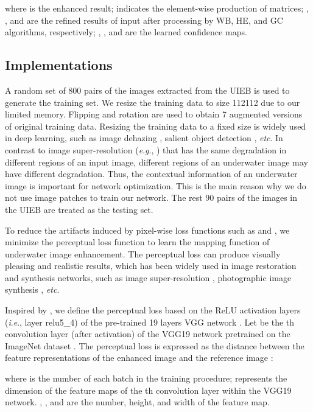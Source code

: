 \documentclass[journal]{IEEEtran}
\newcommand{\ie}{\textit{i}.\textit{e}.}
\newcommand{\eg}{\textit{e}.\textit{g}.}
\newcommand{\etc}{\textit{etc}}
\begin{document}
where  is the enhanced result;  indicates the element-wise production of matrices; , , and  are the refined results of input after processing by WB, HE, and GC algorithms, respectively; , , and  are the learned confidence maps.




\subsection{Implementations}



A random set of 800 pairs of the images extracted from the UIEB is used to generate the training set. We resize the training data to size 112112 due to our limited memory. Flipping and rotation are used to obtain 7 augmented versions of original training data.
Resizing the training data to a fixed size is widely used in deep learning, such as image dehazing \cite{Ren2016}, salient object detection \cite{Saliency}, \etc.
In contrast to image super-resolution (\eg, \cite{SRCNN}) that has the same degradation in different regions of an input image, different regions of an underwater image may have different degradation. Thus, the contextual information of an underwater image is important for network optimization. This is the main reason why we do not use image patches to train our network.
The rest 90 pairs of the images in the UIEB are treated as the testing set.

To reduce the artifacts induced by pixel-wise loss functions such as  and , we minimize the perceptual loss function to learn the mapping function of underwater image enhancement. The perceptual loss can produce visually pleasing and realistic results, which has been widely used in image restoration and synthesis networks, such as image super-resolution \cite{Johnson}, photographic image synthesis \cite{Chen2017}, \etc.
		
Inspired by \cite{Johnson}, we define the perceptual loss based on the ReLU activation layers (\ie, layer relu5\_4) of the pre-trained 19 layers VGG network \cite{Simonyan}. Let  be the th convolution layer (after activation) of the VGG19 network  pretrained on the ImageNet dataset \cite{Deng}. The perceptual loss is expressed as the distance between the feature representations of the enhanced image  and the reference image :

where  is the number of each batch in the training procedure;  represents the dimension of the feature maps of the th convolution layer within the VGG19 network. , , and  are the number, height, and width of the feature map.
\end{document}
